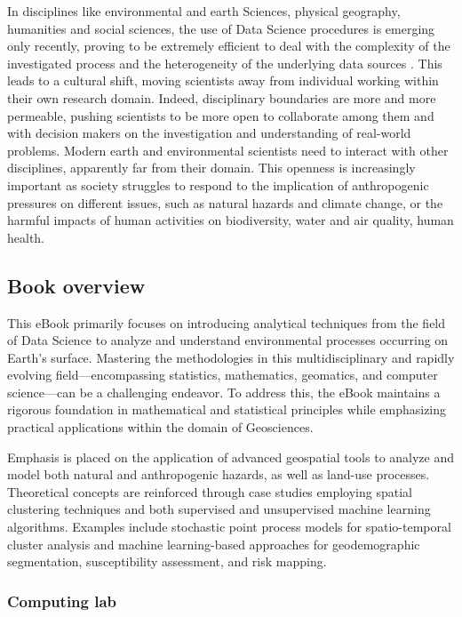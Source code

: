 \documentclass[
]{article}
\begin{document}
In disciplines like environmental and earth Sciences, physical geography, humanities and social sciences, the use of Data Science procedures is emerging only recently, proving to be extremely efficient to deal with the complexity of the investigated process and the heterogeneity of the underlying data sources \citep{amato_spatiotemporal_2022}.
This leads to a cultural shift, moving scientists away from individual working within their own research domain.
Indeed, disciplinary boundaries are more and more permeable, pushing scientists to be more open to collaborate among them and with decision makers on the investigation and understanding of real-world problems.
Modern earth and environmental scientists need to interact with other disciplines, apparently far from their domain.
This openness is increasingly important as society struggles to respond to the implication of anthropogenic pressures on different issues, such as natural hazards and climate change, or the harmful impacts of human activities on biodiversity, water and air quality, human health.

\subsection*{Book overview}\label{book-overview}

This eBook primarily focuses on introducing analytical techniques from the field of Data Science to analyze and understand environmental processes occurring on Earth's surface.
Mastering the methodologies in this multidisciplinary and rapidly evolving field---encompassing statistics, mathematics, geomatics, and computer science---can be a challenging endeavor.
To address this, the eBook maintains a rigorous foundation in mathematical and statistical principles while emphasizing practical applications within the domain of Geosciences.

Emphasis is placed on the application of advanced geospatial tools to analyze and model both natural and anthropogenic hazards, as well as land-use processes.
Theoretical concepts are reinforced through case studies employing spatial clustering techniques and both supervised and unsupervised machine learning algorithms.
Examples include stochastic point process models for spatio-temporal cluster analysis and machine learning-based approaches for geodemographic segmentation, susceptibility assessment, and risk mapping.

\subsubsection*{Computing lab}\label{computing-lab}
\end{document}
